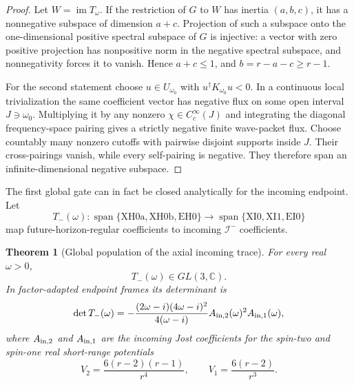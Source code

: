 \documentclass[11pt]{article}
\newtheorem{theorem}{Theorem}[section]
\theoremstyle{definition}
\theoremstyle{remark}
\begin{document}
\begin{proof}
Let \(W=\operatorname{im}T_\omega\).  If the restriction of \(G\) to \(W\)
has inertia \((a,b,c)\), it has a nonnegative subspace of dimension
\(a+c\).  Projection of such a subspace onto the one-dimensional positive
spectral subspace of \(G\) is injective: a vector with zero positive
projection has nonpositive norm in the negative spectral subspace, and
nonnegativity forces it to vanish.  Hence \(a+c\leq1\), and
\(b=r-a-c\geq r-1\).

For the second statement choose \(u\in U_{\omega_0}\) with
\(u^\dagger K_{\omega_0}u<0\).  In a continuous local trivialization the
same coefficient vector has negative flux on some open interval
\(J\ni\omega_0\).  Multiplying it by any nonzero
\(\chi\in C_c^\infty(J)\) and integrating the diagonal frequency-space
pairing gives a strictly negative finite wave-packet flux.
Choose countably many nonzero cutoffs with pairwise disjoint supports inside
\(J\).  Their cross-pairings vanish, while every self-pairing is negative.
They therefore span an infinite-dimensional negative subspace.
\end{proof}

The first global gate can in fact be closed analytically for the incoming
endpoint.  Let
\[
 T_-(\omega):
 \operatorname{span}\{\mathrm{XH0a},\mathrm{XH0b},\mathrm{EH0}\}
 \longrightarrow
 \operatorname{span}\{\mathrm{XI0},\mathrm{XI1},\mathrm{EI0}\}
\]
map future-horizon-regular coefficients to incoming
\(\mathscr I^-\) coefficients.

\begin{theorem}[Global population of the axial incoming trace]
\label{thm:axial-incoming-connection}
For every real \(\omega>0\),
\[
 T_-(\omega)\in GL(3,\mathbb C).
\]
In factor-adapted endpoint frames its determinant is
\[
 \det T_-(\omega)=
 -\frac{(2\omega-i)(4\omega-i)^2}{4(\omega-i)}
 A_{{\rm in},2}(\omega)^2A_{{\rm in},1}(\omega),
\]
where \(A_{{\rm in},2}\) and \(A_{{\rm in},1}\) are the incoming Jost
coefficients for the spin-two and spin-one real short-range potentials
\[
 V_2=\frac{6(r-2)(r-1)}{r^4},
 \qquad
 V_1=\frac{6(r-2)}{r^3}.
\]
\end{theorem}
\end{document}
